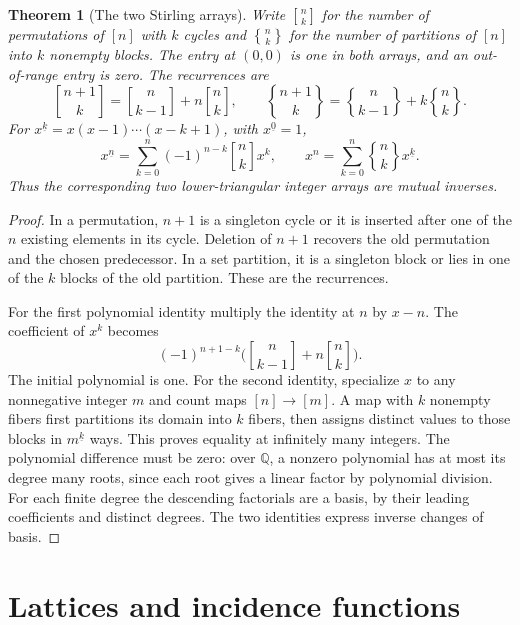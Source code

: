 \documentclass[11pt,oneside,openany]{book}
\newcommand{\bracketbinom}[2]{\genfrac{[}{]}{0pt}{}{#1}{#2}}
\newcommand{\bracebinom}[2]{\genfrac{\{}{\}}{0pt}{}{#1}{#2}}
\theoremstyle{plain}
\newtheorem{theorem}{Theorem}[chapter]
\theoremstyle{definition}
\theoremstyle{remark}
\begin{document}
\begin{theorem}[The two Stirling arrays]\label{p204:W05}
Write \(\bracketbinom{n}{k}\) for the number of permutations of \([n]\) with
\(k\) cycles and \(\bracebinom{n}{k}\) for the number of partitions of \([n]\)
into \(k\) nonempty blocks. The entry at \((0,0)\) is one in both
arrays, and an out-of-range entry is zero. The recurrences are
\[
 \bracketbinom{n+1}{k}=\bracketbinom{n}{k-1}+n\bracketbinom{n}{k},
 \qquad
 \bracebinom{n+1}{k}=\bracebinom{n}{k-1}+k\bracebinom{n}{k}.
\]
For \(x^{\underline k}=x(x-1)\cdots(x-k+1)\), with
\(x^{\underline0}=1\),
\[
 x^{\underline n}=\sum_{k=0}^n(-1)^{n-k}\bracketbinom{n}{k}x^k,
 \qquad
 x^n=\sum_{k=0}^n \bracebinom{n}{k}x^{\underline k}.
\]
Thus the corresponding two lower-triangular integer arrays are
mutual inverses.
\end{theorem}
\begin{proof}
In a permutation, \(n+1\) is a singleton cycle or it is inserted
after one of the \(n\) existing elements in its cycle. Deletion of
\(n+1\) recovers the old permutation and the chosen predecessor.
In a set partition, it is a singleton block or lies in one of the
\(k\) blocks of the old partition. These are the recurrences.

For the first polynomial identity multiply the identity at \(n\) by
\(x-n\). The coefficient of \(x^k\) becomes
\[
 (-1)^{n+1-k}\bigl(\bracketbinom{n}{k-1}+n\bracketbinom{n}{k}\bigr).
\]
The initial polynomial is one. For the second identity, specialize
\(x\) to any nonnegative integer \(m\) and count maps
\([n]\to[m]\). A map with \(k\) nonempty fibers first partitions its
domain into \(k\) fibers, then assigns distinct values to those blocks
in \(m^{\underline k}\) ways. This proves equality at infinitely
many integers. The polynomial difference must be zero: over
\(\mathbb Q\), a nonzero polynomial has at most its degree many
roots, since each root gives a linear factor by polynomial division.
For each finite degree the descending factorials are a basis,
by their leading coefficients and distinct degrees. The two
identities express inverse changes of basis.
\end{proof}

\section{Lattices and incidence functions}
\end{document}
